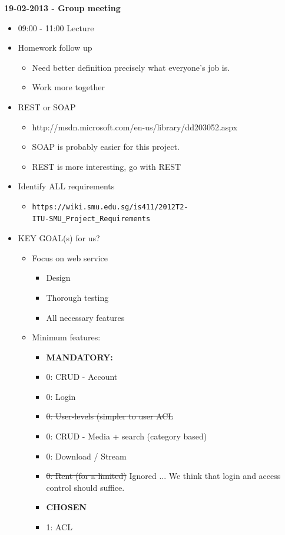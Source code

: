 \documentclass[11pt]{article}
\begin{document}
\begin{landscape}
\begin{multicols}{2}
\textbf{19-02-2013 - Group meeting}
\begin{itemize}
\item 09:00 - 11:00 Lecture
\item Homework follow up
\begin{itemize}
\item Need better definition precisely what everyone's job is.
\item Work more together
\end{itemize}
\item REST or SOAP
\begin{itemize}
\item http://msdn.microsoft.com/en-us/library/dd203052.aspx
\item SOAP is probably easier for this project.
\item REST is more interesting, go with REST
\end{itemize}
\item Identify ALL requirements
\begin{itemize}
\item \begin{verbatim}
https://wiki.smu.edu.sg/is411/2012T2-
ITU-SMU_Project_Requirements
\end{verbatim}
\end{itemize}
\item KEY GOAL(s) for us?
\begin{itemize}
\item Focus on web service
\begin{itemize}
\item Design
\item Thorough testing
\item All necessary features
\end{itemize}
\item Minimum features:
\begin{itemize}
\item \textbf{MANDATORY:}
\item 0: CRUD - Account
\item 0: Login
\item \st{0: User-levels (simpler to user ACL}
\item 0: CRUD - Media + search (category based)
\item 0: Download / Stream
\item \st{0: Rent (for a limited)} Ignored ... We think that login and access control should suffice.
\item \textbf{CHOSEN}
\item 1: ACL

\end{itemize}
\end{itemize}
\end{itemize}
\end{multicols}
\end{landscape}
\end{document}
